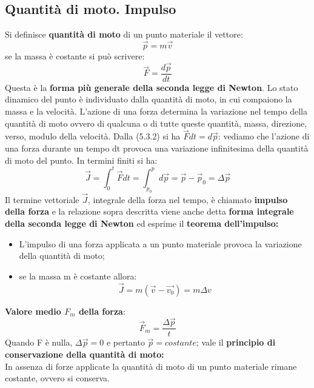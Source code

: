 \documentclass{article}
\numberwithin{equation}{subsection}
\begin{document}
  \subsection{Quantità di moto. Impulso}
  Si definisce \textbf{quantità di moto} di un punto materiale il vettore:
  \begin{equation}
      \vec{p}= m\vec{v}
  \end{equation}
  se la massa è costante si può scrivere:
  \begin{equation}
      \vec{F}=\frac{d\vec{p}}{dt}
  \end{equation}
  Questa è la \textbf{forma più generale della seconda legge di Newton}. Lo stato dinamico del punto è individuato dalla quantità di moto, in cui compaiono la massa e la velocità. L'azione di una forza determina la variazione nel tempo della quantità di moto ovvero di qualcuna o di tutte queste quantità, massa, direzione, verso, modulo della velocità. Dalla (5.3.2) si ha $\vec{F}dt=d\vec{p}$: vediamo che l'azione di una forza durante un tempo dt provoca una variazione infinitesima della quantità di moto del punto. In termini finiti si ha:
  \begin{equation}
      \vec{J}=\int_{0}^t \vec{F}dt = \int_{p_0}^p d\vec{p}= \vec{p}-\vec{p}_0=\Delta \vec{p}
  \end{equation}
  Il termine vettoriale $\vec{J}$, integrale della forza nel tempo, è chiamato \textbf{impulso della forza} e la relazione sopra descritta viene anche detta \textbf{forma integrale della seconda legge di Newton} ed esprime il \textbf{teorema dell'impulso:}\\
  \begin{itemize}
      \item L'impulso di una forza applicata a un punto materiale provoca la variazione della quantità di moto;
      \item se la massa m è costante allora:
      \begin{equation}
          \vec{J}=m (\vec{v}-\vec{v_0})=m \Delta v
      \end{equation}
  \end{itemize}
\textbf{Valore medio $F_m$ della forza}:
\begin{equation}
    \vec{F}_m= \frac{\Delta \vec{p}}{t}
\end{equation}
Quando F è nulla, $\Delta \vec{p}=0$ e pertanto $\vec{p}=costante$; vale il \textbf{principio di conservazione della quantità di moto:}\\
In assenza di forze applicate la quantità di moto di un punto materiale rimane costante, ovvero si conserva.
\end{document}
